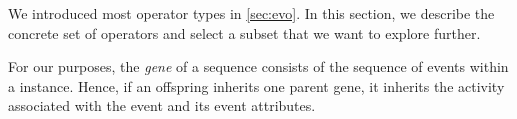 \documentclass[./../../paper.tex]{subfiles}
\begin{document}





We introduced most operator types in \autoref{sec:evo}.
In this section, we describe the concrete set of operators and select a subset that we want to explore further.

For our purposes, the \emph{gene} of a sequence consists of the sequence of events within a \gls{instance}. Hence, if an offspring inherits one parent gene, it inherits the activity associated with the event and its event attributes.
\end{document}
